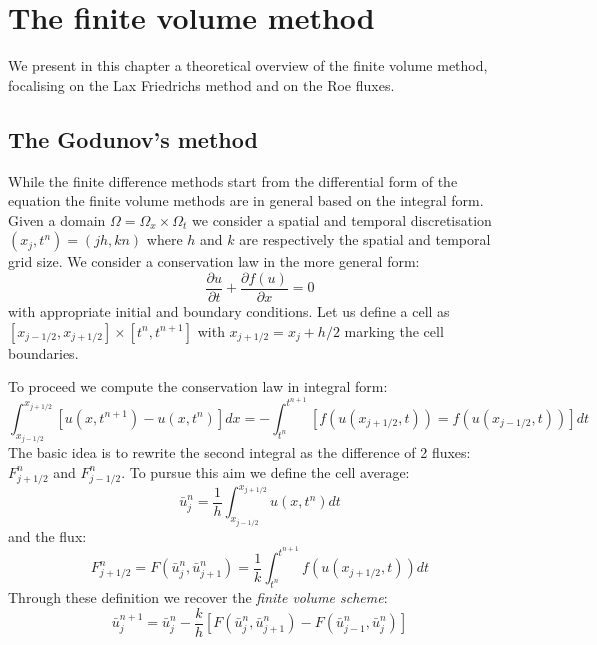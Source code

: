 \documentclass[oneside,12pt]{book}  %
\theoremstyle{plain}
\theoremstyle{definition}
\theoremstyle{remark}
\numberwithin{equation}{chapter} %
\begin{document}
\chapter{The finite volume method}
We present in this chapter a theoretical overview of the finite volume
method, focalising on the Lax Friedrichs method and on the Roe
fluxes. 
\section{The Godunov's method}
While the finite difference methods start from the differential form
of the equation the finite volume methods are in general based on the
integral form.
Given a domain $\Omega=\Omega_x\times \Omega_t$ we consider a spatial
and temporal discretisation $(x_j,t^n)=(jh,kn)$ where $h$ and $k$ are
respectively the spatial and temporal grid size.
We consider a conservation law in the more general form:
\begin{equation}
  \label{eq:conservation_law}
  \frac{\partial u}{\partial t}+\frac{\partial f(u)}{\partial x}=0
\end{equation}
with appropriate initial and boundary conditions.
Let us define a cell as $[x_{j-1/2},x_{j+1/2}]\times [t^n,t^{n+1}]$
with $x_{j+1/2}=x_j+h/2$ marking the cell boundaries. 

To proceed we compute the conservation law in integral form:
\begin{equation}
  \label{eq:conservation_law_integral_form}
  \int_{x_{j-1/2}}^{x_{j+1/2}}[u(x,t^{n+1})-u(x,t^n)]dx=-\int_{t^n}^{t^{n+1}}[f(u(x_{j+1/2},t))=f(u(x_{j-1/2},t))]dt
\end{equation}
The basic idea is to rewrite the second integral as the difference of
2 fluxes: $F^{n}_{j+1/2}$ and $F^{n}_{j-1/2}$. 
To pursue this aim we define the cell average:
\begin{equation}
  \label{eq:cell_average}
  \bar{u}^{n}_{j}=\frac{1}{h}\int_{x_{j-1/2}}^{x_{j+1/2}}u(x,t^{n})dt
\end{equation}
and the flux:
\begin{equation}
  \label{eq:generic_flux}
  F^{n}_{j+1/2}=F(\bar{u}^{n}_{j},\bar{u}^{n}_{j+1})=\frac{1}{k}\int_{t^n}^{t^{n+1}}f(u(x_{j+1/2},t))dt
\end{equation}
Through these definition we recover the \textit{finite volume scheme}:
\begin{equation}
  \label{eq:generic_finite_volume}
  \bar{u}^{n+1}_{j}=\bar{u}^{n}_{j}-\frac{k}{h}[F(\bar{u}^{n}_{j},\bar{u}^{n}_{j+1})-F(\bar{u}^{n}_{j-1},\bar{u}^{n}_{j})]
\end{equation}
\end{document}
